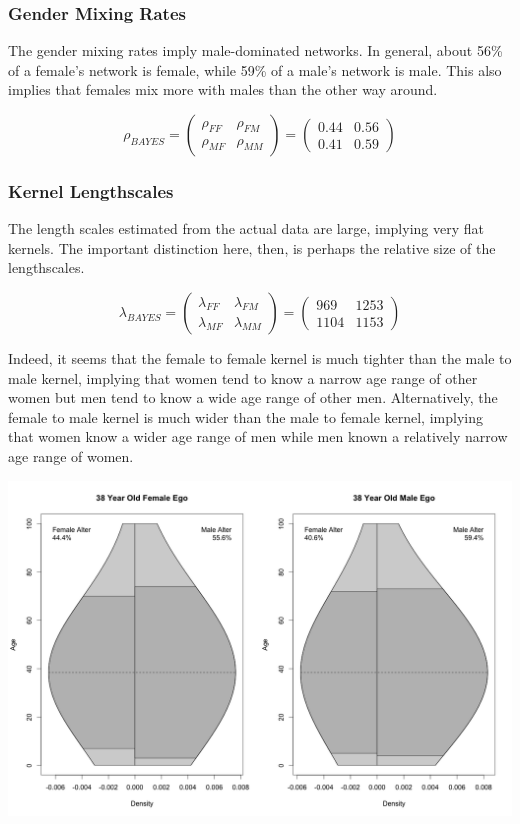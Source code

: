 \documentclass[12pt]{article}
\begin{document}
\subsubsection*{Gender Mixing Rates}
\noindent The gender mixing rates imply male-dominated networks. In general, about 56\% of a female's network is female, while 59\% of a male's network is male. This also implies that females mix more with males than the other way around.

$$ \rho_{BAYES}
= \left( \begin{array}{cc} \rho_{FF} & \rho_{FM} \\
\rho_{MF} & \rho_{MM} \end{array} \right) 
= \left( \begin{array}{cc}
0.44 & 0.56 \\
0.41 & 0.59 \end{array} \right) $$

\pagebreak
\subsubsection*{Kernel Lengthscales}
\noindent The length scales estimated from the actual data are large, implying very flat kernels. The important distinction here, then, is perhaps the relative size of the lengthscales.

$$ \lambda_{BAYES}
= \left( \begin{array}{cc} \lambda_{FF} & \lambda_{FM} \\
\lambda_{MF} & \lambda_{MM} \end{array} \right) 
= \left( \begin{array}{cc}
969 & 1253 \\
1104 & 1153 \end{array} \right) $$ \vspace{7 pt}

\noindent Indeed, it seems that the female to female kernel is much tighter than the male to male kernel, implying that women tend to know a narrow age range of other women but men tend to know a wide age range of other men. Alternatively, the female to male kernel is much wider than the male to female kernel, implying that women know a wider age range of men while men known a relatively narrow age range of women.

\begin{center}
\includegraphics[scale = 0.36]{fig/kern_name_sex.png}
\end{center}
\end{document}
